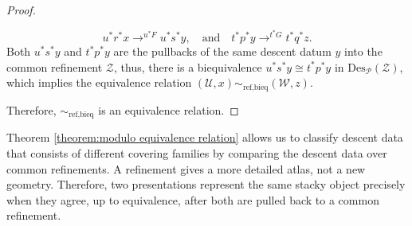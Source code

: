\documentclass[reqno]{amsart}
\theoremstyle{definition}
\theoremstyle{remark}
\begin{document}
\begin{proof}
\begin{enumerate}
        \begin{equation}
            u^* r^* x \mathop{\longrightarrow}^{u^*F} u^*s^*y, \quad \text{and}\quad  t^* p^*y\mathop{\longrightarrow}^{t^*G} t^*q^*z.
        \end{equation}
        Both $u^*s^*y$ and $t^* p^*y$ are the pullbacks of the same descent datum $y$ into the common refinement $\mathcal{Z}$, thus, there is a biequivalence $u^*s^*y \cong t^* p^*y$ in $\text{Des}_\mathscr{P}(\mathcal{Z})$, which implies the equivalence relation $(\mathcal{U},x) \sim_{\text{ref,bieq}} (\mathcal{W},z)$. 
    \end{enumerate}
    Therefore, $\sim_{\text{ref,bieq}}$ is an equivalence relation.
\end{proof}
Theorem \ref{theorem:modulo equivalence relation} allows us to classify descent data that consists of different covering families by comparing the descent data over common refinements. A refinement gives a more detailed atlas, not a new geometry. Therefore, two presentations represent the same stacky object precisely when they agree, up to equivalence, after both are pulled back to a common refinement. 
\end{document}
